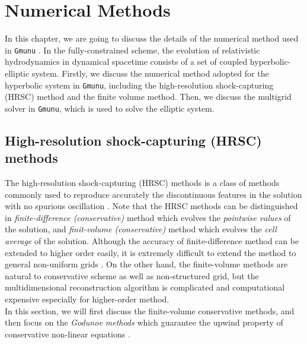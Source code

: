 
\chapter{Numerical Methods}  %

\ifpdf
    \graphicspath{{Chapter3/Figs/PDF/}{Chapter3/Figs/}}
\else
    \graphicspath{{Chapter3/Figs/}}
\fi

In this chapter, we are going to discuss the details of the numerical method used in \texttt{Gmunu} \cite{cheong2020gmunu,cheong2020gmunu_amr}.
In the fully-constrained scheme, the evolution of relativistic hydrodynamics in dynamical spacetime
consists of a set of coupled hyperbolic-elliptic system.
Firstly, we discuss the numerical method adopted for the hyperbolic system in \texttt{Gmunu},
including the high-resolution shock-capturing (HRSC) method and the finite volume method.
Then, we discuss the multigrid solver in \texttt{Gmunu},
which is used to solve the elliptic system.

\section{High-resolution shock-capturing (HRSC) methods}
The high-resolution shock-capturing (HRSC) methods is a class of methods commonly used to
reproduce accurately the discontinuous features in the solution
with no spurious oscillation \cite{harten1997high}.
Note that the HRSC methods can be distinguished in \textit{finite-difference (conservative)} method
which evolves the \textit{pointwise values} of the solution,
and \textit{finit-volume (conservative)} method which evolves the \textit{cell average} of the solution.
Although the accuracy of finite-difference method can be extended to higher order easily,
it is extremely difficult to extend the method to general non-uniform grids \cite{merriman2003understanding}.
On the other hand,
the finite-volume methods are natural to conservative scheme as well as non-structured grid,
but the multidimensional reconstruction algorithm is complicated and computational expensive especially for higher-order method.\\
In this section,
we will first discuss the finite-volume conservative methods,
and then focus on the \textit{Godunov methods} which guarantee the upwind property of conservative non-linear equations \cite{van1999introduction}.

